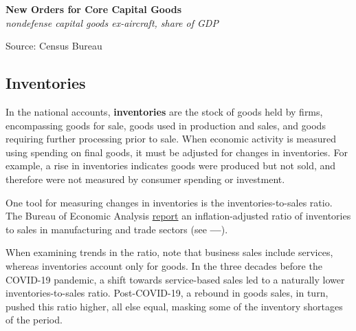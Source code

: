 \documentclass{report}
\makeatletter
\newcommand{\tbllink}[1]{\href{https://raw.githubusercontent.com/bdecon/US-chartbook/master/chartbook/data/#1}{\faTable}}
\newcommand*\short[1]{\expandafter\@gobbletwo\number\numexpr#1\relax}
\newcommand{\shdateaxisticks}{
		date coordinates in=x, axis line style={draw=none},
		xmax={2023-11-30},
		max space between ticks=40,	    
		xtick={{1990-01-01}, {1995-01-01}, {2000-01-01}, 
			{2005-01-01}, {2010-01-01}, {2015-01-01}, {2020-01-01}},
		minor xtick={},
		enlarge y limits={0.06}, enlarge x limits={0.01},
		xticklabel style={align=center, yshift=-2pt}, tick label style={inner sep=0pt},
		}
\newcommand{\bbar}[2]{extra #1 ticks = {{#2}}, extra #1 tick labels = ,
		extra #1 tick style = {grid=major, grid style={thick, black!25}},}
\newcommand{\thickline}[4]{\addplot[ultra thick, no markers, color=#1] 
		table [x=#2, y=#3, col sep=comma] {#4};	}
\newcommand{\rebars}{
		\fill[color=black!10] (axis cs:{2007-12-01},\pgfkeysvalueof{/pgfplots/ymin}) rectangle 
			(axis cs:{2009-07-01}, \pgfkeysvalueof{/pgfplots/ymax});
		\fill[color=black!10] (axis cs:{2001-03-01},\pgfkeysvalueof{/pgfplots/ymin}) rectangle 
			(axis cs:{2001-11-01}, \pgfkeysvalueof{/pgfplots/ymax});
		\fill[color=black!10] (axis cs:{2020-02-01},\pgfkeysvalueof{/pgfplots/ymin}) rectangle 
			(axis cs:{2020-05-01}, \pgfkeysvalueof{/pgfplots/ymax});}
\makeatother
\begin{document}
{\begin{minipage}{0.32\textwidth}

\end{minipage} \hspace{5mm}
\begin{minipage}{0.4\textwidth}
\normalsize \textbf{New Orders for Core Capital Goods}\\
\footnotesize{\textit{nondefense capital goods ex-aircraft, share of GDP}}
\vspace{3.7cm}

\hspace{2mm} 

\footnotesize{Source: Census Bureau} \hfill \tbllink{dgno.csv} \ 
\end{minipage}
\vspace{10mm}

\begin{minipage}{0.76\textwidth}  
\subsection*{Inventories} 
\small In the national accounts, \textbf{inventories} are the stock of goods held by firms, encompassing goods for sale, goods used in production and sales, and goods requiring further processing prior to sale. When economic activity is measured using spending on final goods, it must be adjusted for changes in inventories. For example, a rise in inventories indicates goods were produced but not sold, and therefore were not measured by consumer spending or investment. 

One tool for measuring changes in inventories is the inventories-to-sales ratio. The Bureau of Economic Analysis \href{https://apps.bea.gov/iTable/index_UD.cfm}{report} an inflation-adjusted ratio of inventories to sales in manufacturing and trade sectors (see {\color{blue!60!green}\textbf{---}}). 

When examining trends in the ratio, note that business sales include services, whereas inventories account only for goods. In the three decades before the COVID-19 pandemic, a shift towards service-based sales led to a naturally lower inventories-to-sales ratio. Post-COVID-19, a rebound in goods sales, in turn, pushed this ratio higher, all else equal, masking some of the inventory shortages of the period. 
\end{minipage}

}
\end{document}
